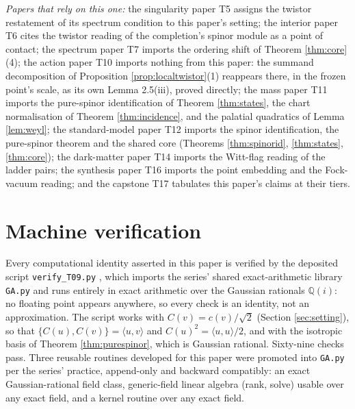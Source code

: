\documentclass[11pt]{article}
\theoremstyle{definition}
\newcommand{\ip}[2]{\langle #1, #2\rangle}
\begin{document}
\emph{Papers that rely on this one:} the singularity paper T5 \cite{ButlerT5} assigns the twistor restatement of its spectrum condition to this paper's setting; the interior paper T6 \cite{ButlerT6} cites the twistor reading of the completion's spinor module as a point of contact; the spectrum paper T7 \cite{ButlerT7} imports the ordering shift of Theorem \ref{thm:core}(4); the action paper T10 \cite{ButlerT10} imports nothing from this paper: the summand decomposition of Proposition \ref{prop:localtwistor}(1) reappears there, in the frozen point's scale, as its own Lemma 2.5(iii), proved directly; the mass paper T11 \cite{ButlerT11} imports the pure-spinor identification of Theorem \ref{thm:states}, the chart normalisation of Theorem \ref{thm:incidence}, and the palatial quadratics of Lemma \ref{lem:weyl}; the standard-model paper T12 \cite{ButlerT12} imports the spinor identification, the pure-spinor theorem and the shared core (Theorems \ref{thm:spinorid}, \ref{thm:states}, \ref{thm:core}); the dark-matter paper T14 \cite{ButlerT14} imports the Witt-flag reading of the ladder pairs; the synthesis paper T16 \cite{ButlerT16} imports the point embedding and the Fock-vacuum reading; and the capstone T17 \cite{ButlerT17} tabulates this paper's claims at their tiers.

\section{Machine verification}\label{sec:verification}

Every computational identity asserted in this paper is verified by the deposited script \verb|verify_T09.py| \cite{ButlerVerifyT9}, which imports the series' shared exact-arithmetic library \verb|GA.py| and runs entirely in exact arithmetic over the Gaussian rationals $\mathbb{Q}(i)$: no floating point appears anywhere, so every check is an identity, not an approximation. The script works with $C(v) = c(v)/\sqrt2$ (Section \ref{sec:setting}), so that $\{C(u), C(v)\} = \ip{u}{v}$ and $C(u)^2 = \ip{u}{u}/2$, and with the isotropic basis of Theorem \ref{thm:purespinor}, which is Gaussian rational. Sixty-nine checks pass. Three reusable routines developed for this paper were promoted into \verb|GA.py| per the series' practice, append-only and backward compatibly: an exact Gaussian-rational field class, generic-field linear algebra (rank, solve) usable over any exact field, and a kernel routine over any exact field.
\end{document}
